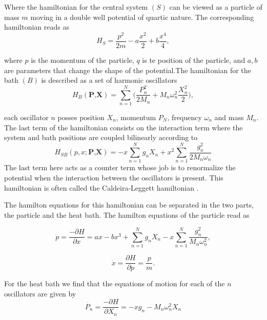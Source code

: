 Where the hamiltonian for the central system $(S)$ can be viewed as a particle of mass $m$ moving in a double well potential of quartic nature. The corresponding hamiltonian reads as
\begin{equation}
H_{S}=\frac{p^2}{2m}-a\frac{x^2}{2}+b\frac{x^4}{4},
\end{equation}

where $p$ is the momentum of the particle, $q$ is te position of the particle, and $a,b$ are parameters that change the shape of the potential.The hamiltonian for the bath $(B)$ is described as a set of harmonic oscillators
\begin{equation}
H_B(\textbf{P,X})= \sum_{n=1}^N \Big(\frac{P_n^2}{2M_n}+M_n \omega_n^2\frac{X_n^2}{2} \Big),
\end{equation}

each oscillator $n$ posses position $X_n$, momentum $P_N$, frequency $\omega_n$ and mass $M_n$. The last term of the hamiltonian consists on the interaction term where the system and bath positions are coupled bilinearly according to
\begin{equation}
H_{SB}(p,x;\textbf{P,X})=-x\sum_{n=1}^N g_n X_n+x^2 \sum_{n=1}^N\frac{g_n^2}{2M_n \omega_n}
\end{equation}
The last term here acts as a counter term whose job is to renormalize the potential when the interaction between the oscillators is present. This hamiltonian is often called the Caldeira-Leggett hamiltonian \cite{caldeira1981influence}.\par 

The hamilton equations for this hamiltonian can be separated in the two parts, the particle and the heat bath. The hamilton equations of the particle read as

\begin{equation}
\dot{p}=\frac{-\partial H}{\partial x}=ax-bx^3+\sum_{n=1}^N g_n X_n-x\sum_{n=1}^N \frac{g_n^2}{M_n \omega_n^2},
\end{equation}

\begin{equation}
\dot{x}=\frac{\partial H}{\partial p}=\frac{p}{m}.
\end{equation}

For the heat bath we find that the equations of motion for each of the $n$ oscillators are given by
\begin{equation}
\dot{P_n}=\frac{-\partial H}{\partial X_n}=-xg_n-M_n \omega _n ^2 X_n
\end{equation}

